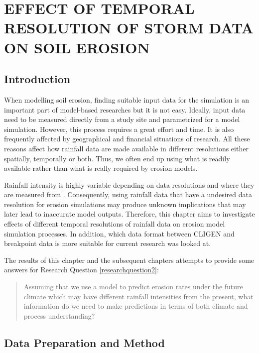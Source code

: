 \chapter{EFFECT OF TEMPORAL RESOLUTION OF STORM DATA ON SOIL EROSION}
\label{sec:EFFECTSOFTEMPORALSCALESOFSTROMDATA}

\section{Introduction}
\label{sec:TemporalScalesEffectsIntroduction}

When modelling soil erosion, finding suitable input data for the simulation is
an important part of model-based researches but it is not easy. Ideally, input
data need to be measured directly from a study site and parametrized for a model
simulation. However, this process requires a great effort and time. It is also
frequently affected by geographical and financial situations of research. All
these reasons affect how rainfall data are made available in different
resolutions
either spatially, temporally or both. Thus, we often end up using what is
readily available rather than what is really required by erosion models.

Rainfall intensity is highly variable depending on data resolutions and where
they
are measured from \citep{nyssen2005-172}. Consequently, using rainfall data
that have a undesired data resolution for erosion simulations may produce
unknown
implications that may later lead to inaccurate model outputs. Therefore, this
chapter aims to investigate effects of different temporal resolutions of
rainfall
data on erosion model simulation processes. In addition, which data format
between CLIGEN and breakpoint data is more suitable for current research was
looked at.

The results of this chapter and the subsequent chapters attempts to provide some
answers for Research Question \ref{researchquestion2}:\
\begin{quotation}
Assuming that we use a model to predict erosion rates under the future climate
which may have different rainfall intensities from the present, what information
do we need to make predictions in terms of both climate and process
understanding?
\end{quotation}

\section{Data Preparation and Method}
\label{sec:TemporalScalesEffectsMethods}

